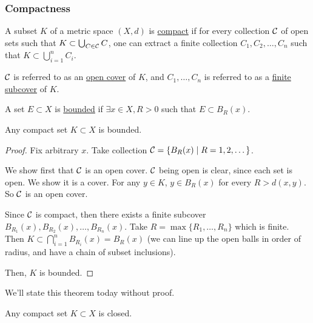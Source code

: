 \subsubsection{Compactness}
\begin{definition}[Compactness]
    A subset $K$ of a metric space $(X, d)$ is \ul{compact} if for every collection $\mathcal C$ of open sets such that $K\subset \bigcup_{C\in \mathcal C}C$, one can extract a finite collection $C_1, C_2, \dots, C_n$ such that $K\subset \bigcup_{i=1}^n C_i$.

    $\mathcal C$ is referred to as an \ul{open cover} of $K$, and $C_1, \dots, C_n$ is referred to as a \ul{finite subcover} of $K$.
\end{definition}

\begin{definition}[Boundedness]
    A set $E\subset X$ is \ul{bounded} if $\exists x\in X, R > 0$ such that $E\subset B_R(x)$.
\end{definition}
\begin{theorem}
    \label{thm:compact-implies-bounded}
    Any compact set $K\subset X$ is bounded.
\end{theorem}
\begin{proof}
    Fix arbitrary $x$. Take collection $\mathcal C = \left\{ B_R(x) \mid R = 1, 2, \dots \right\}$.

    We show first that $\mathcal C$ is an open cover. $\mathcal C$ being open is clear, since each set is open. We show it is a cover. For any $y\in K$, $y\in B_R(x)$ for every $R > d(x, y)$. So $\mathcal C$ is an open cover.

    Since $\mathcal C$ is compact, then there exists a finite subcover $B_{R_1}(x), B_{R_2}(x), \dots, B_{R_n}(x)$. Take $R = \max\{R_1, \dots, R_n\}$ which is finite. Then $K\subset \bigcap_{i=1}^n B_{R_i}(x) = B_R(x)$ (we can line up the open balls in order of radius, and have a chain of subset inclusions).

    Then, $K$ is bounded.
\end{proof}

We'll state this theorem today without proof.
\begin{theorem}
    \label{thm:compact-implies-closed}
    Any compact set $K\subset X$ is closed.
\end{theorem}
